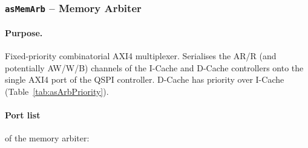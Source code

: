 

\subsubsection{\texttt{asMemArb} -- Memory Arbiter}
\label{subsubsec:asMemArb}

\paragraph{Purpose.}
Fixed-priority combinatorial AXI4 multiplexer.
Serialises the AR/R (and potentially AW/W/B) channels of the I-Cache
and D-Cache controllers onto the single AXI4 port of the QSPI
controller.
D-Cache has priority over I-Cache (Table~\ref{tab:asArbPriority}).

\paragraph{Port list} of the memory arbiter:

